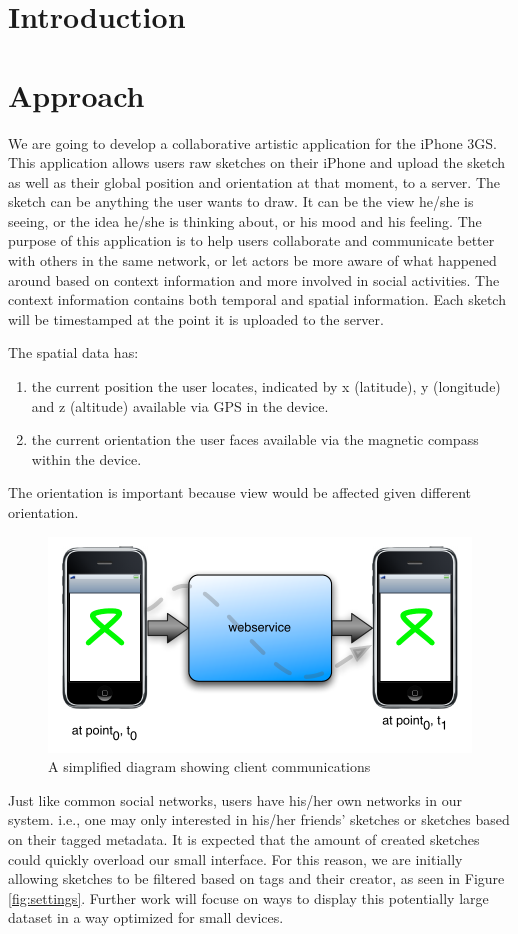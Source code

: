 \documentclass{chi2009}
\begin{document}
\section{Introduction}


\section{Approach}
We are going to develop a collaborative artistic application for the iPhone 3GS. This application allows users raw sketches on their iPhone and upload the sketch as well as their global position and orientation at that moment, to a server. The sketch can be anything the user wants to draw. It can be the view he/she is seeing, or the idea he/she is thinking about, or his mood and his feeling. The purpose of this application is to help users collaborate and communicate better with others in the same network, or let actors be more aware of what happened around based on context information and more involved in social activities. The context information contains both temporal and spatial information. Each sketch will be timestamped at the point it is uploaded to the server.

The spatial data has:
\begin{enumerate}
\item the current position the user locates, indicated by x (latitude), y
	(longitude) and z (altitude) available via GPS in the device.
\item the current orientation the user faces available via the magnetic compass
	within the device.  
\end{enumerate}

The orientation is important because view would be affected given different
orientation.

\begin{figure}
\centering
\includegraphics[width=.45\textwidth]{arch.pdf}
\caption{A simplified diagram showing client communications}
\label{fig:arch}
\end{figure}

Just like common social networks, users have his/her own networks in our
system. i.e., one may only interested in his/her friends' sketches or sketches
based on their tagged metadata.  It is expected that the amount of created
sketches could quickly overload our small interface.  For this reason, we are
initially allowing sketches to be filtered based on tags and their creator, as
seen in Figure \ref{fig:settings}.  Further work will focuse on ways to display
this potentially large dataset in a way optimized for small devices.
\end{document}
